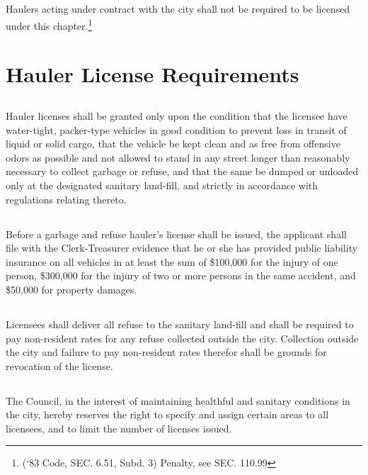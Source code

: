 \subsection{}
Haulers acting under contract with the city shall not be required to be licensed under this chapter.\footnote{(‘83 Code, SEC. 6.51, Subd. 3)  Penalty, see SEC. 110.99}
\section{Hauler License Requirements}
\subsection{}
Hauler licenses shall be granted only upon the condition that the licensee have water-tight, packer-type vehicles in good condition to prevent loss in transit of liquid or solid cargo, that the vehicle be kept clean and as free from offensive odors as possible and not allowed to stand in any street longer than reasonably necessary to collect garbage or refuse, and that the same be dumped or unloaded only at the designated sanitary land-fill, and strictly in accordance with regulations relating thereto.
\subsection{}
Before a garbage and refuse hauler’s license shall be issued, the applicant shall file with the Clerk-Treasurer evidence that he or she has provided public liability insurance on all vehicles in at least the sum of \$100,000 for the injury of one person, \$300,000 for the injury of two or more persons in the same accident, and \$50,000 for property damages.
\subsection{}
Licensees shall deliver all refuse to the sanitary land-fill and shall be required to pay non-resident rates for any refuse collected outside the city.  Collection outside the city and failure to pay non-resident rates therefor shall be grounds for revocation of the license.
\subsection{}
The Council, in the interest of maintaining healthful and sanitary conditions in the city, hereby reserves the right to specify and assign certain areas to all licensees, and to limit the number of licenses issued.
